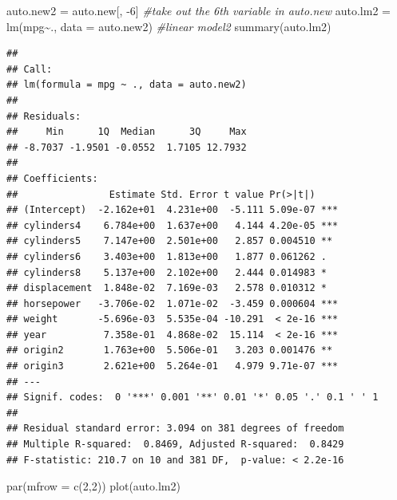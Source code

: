 \documentclass[
]{article}
\newenvironment{Shaded}{\begin{snugshade}}{\end{snugshade}}
\newcommand{\AttributeTok}[1]{\textcolor[rgb]{0.77,0.63,0.00}{#1}}
\newcommand{\CommentTok}[1]{\textcolor[rgb]{0.56,0.35,0.01}{\textit{#1}}}
\newcommand{\DecValTok}[1]{\textcolor[rgb]{0.00,0.00,0.81}{#1}}
\newcommand{\FunctionTok}[1]{\textcolor[rgb]{0.00,0.00,0.00}{#1}}
\newcommand{\NormalTok}[1]{#1}
\newcommand{\OtherTok}[1]{\textcolor[rgb]{0.56,0.35,0.01}{#1}}
\newcommand{\SpecialCharTok}[1]{\textcolor[rgb]{0.00,0.00,0.00}{#1}}
\begin{document}
\begin{Shaded}
\begin{Highlighting}[]
\NormalTok{auto.new2 }\OtherTok{=}\NormalTok{ auto.new[, }\SpecialCharTok{{-}}\DecValTok{6}\NormalTok{] }\CommentTok{\#take out the 6th variable in auto.new}
\NormalTok{auto.lm2 }\OtherTok{=} \FunctionTok{lm}\NormalTok{(mpg}\SpecialCharTok{\textasciitilde{}}\NormalTok{., }\AttributeTok{data =}\NormalTok{ auto.new2) }\CommentTok{\#linear model2}
\FunctionTok{summary}\NormalTok{(auto.lm2)}
\end{Highlighting}
\end{Shaded}

\begin{verbatim}
## 
## Call:
## lm(formula = mpg ~ ., data = auto.new2)
## 
## Residuals:
##     Min      1Q  Median      3Q     Max 
## -8.7037 -1.9501 -0.0552  1.7105 12.7932 
## 
## Coefficients:
##                Estimate Std. Error t value Pr(>|t|)    
## (Intercept)  -2.162e+01  4.231e+00  -5.111 5.09e-07 ***
## cylinders4    6.784e+00  1.637e+00   4.144 4.20e-05 ***
## cylinders5    7.147e+00  2.501e+00   2.857 0.004510 ** 
## cylinders6    3.403e+00  1.813e+00   1.877 0.061262 .  
## cylinders8    5.137e+00  2.102e+00   2.444 0.014983 *  
## displacement  1.848e-02  7.169e-03   2.578 0.010312 *  
## horsepower   -3.706e-02  1.071e-02  -3.459 0.000604 ***
## weight       -5.696e-03  5.535e-04 -10.291  < 2e-16 ***
## year          7.358e-01  4.868e-02  15.114  < 2e-16 ***
## origin2       1.763e+00  5.506e-01   3.203 0.001476 ** 
## origin3       2.621e+00  5.264e-01   4.979 9.71e-07 ***
## ---
## Signif. codes:  0 '***' 0.001 '**' 0.01 '*' 0.05 '.' 0.1 ' ' 1
## 
## Residual standard error: 3.094 on 381 degrees of freedom
## Multiple R-squared:  0.8469, Adjusted R-squared:  0.8429 
## F-statistic: 210.7 on 10 and 381 DF,  p-value: < 2.2e-16
\end{verbatim}

\begin{Shaded}
\begin{Highlighting}[]
\FunctionTok{par}\NormalTok{(}\AttributeTok{mfrow =} \FunctionTok{c}\NormalTok{(}\DecValTok{2}\NormalTok{,}\DecValTok{2}\NormalTok{))}
\FunctionTok{plot}\NormalTok{(auto.lm2)}
\end{Highlighting}
\end{Shaded}
\end{document}
